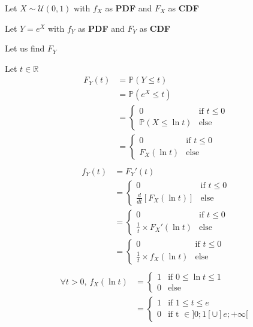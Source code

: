 \documentclass[11pt]{article}
\def\gt{>}
\begin{document}
  Let $ X \sim \mathcal U(0,1)$ with $f_X$ as \textbf{PDF} and $F_X$ as \textbf{CDF}
  
   Let $ Y=e^X$ with $f_Y$ as \textbf{PDF} and $F_Y$ as \textbf{CDF}
   
   Let us find $F_Y$
   
   Let  $t \in \mathbb{R}$
\begin{align*}
F_Y(t)
&=\mathbb {P}(Y \le t)\\  
&=\mathbb {P}(e^X \le t)\\ 
&=  \begin{cases}
            0 & \text{if } t \le 0 \\
            \mathbb {P}(X \le\ln t)& \text{else } 
        \end{cases}   \\
        &=  \begin{cases}
            0 & \text{if } t \le 0 \\
            F_X(\ln t) & \text{else } 
        \end{cases}   \\
\end{align*}
\begin{align*}
f_Y(t)
&=F_Y'(t)\\
&=  \begin{cases}
            0 & \text{if } t \le 0 \\
            \frac{d}{dt} [F_X(\ln t)]& \text{else } 
        \end{cases}   \\
        &=  \begin{cases}
            0 & \text{if } t \le 0 \\
            \frac{1}{t} \times F_X'(\ln t)& \text{else } 
        \end{cases}   \\
        &=  \begin{cases}
            0 & \text{if } t \le 0 \\
            \frac{1}{t} \times f_X(\ln t)& \text{else } 
        \end{cases}   \\  
\end{align*}
\begin{align*}
 \forall t\gt 0 \text{, } f_X(\ln t)
&=  \begin{cases}
            1 & \text{if } 0 \le \ln t \le 1 \\
            0& \text{else } 
        \end{cases}   \\
 &=  \begin{cases}
            1 & \text{if } 1 \le t \le e \\
            0& \text{if t  } \in ]0;1[\cup]e;+\infty[ 
        \end{cases}   \\
\end{align*}
\end{document}
